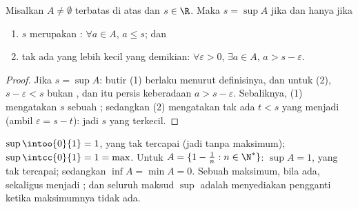 \begin{proposition}\label{prop:b1:reals:epsilon}
Misalkan $A \neq \emptyset$ terbatas di atas dan $s \in \R$. Maka $s =
\sup A$ jika dan hanya jika
\begin{enumerate}
  \item $s$ merupakan : $\forall a \in A$, $a \leq s$; dan
  \item tak ada yang lebih kecil yang demikian: $\forall \varepsilon > 0$, $\exists a \in
        A$, $a > s - \varepsilon$.
\end{enumerate}
\end{proposition}

\begin{proof}
Jika $s = \sup A$: butir (1) berlaku menurut definisinya, dan untuk (2), $s -
\varepsilon < s$ bukan , dan itu persis
keberadaan $a > s - \varepsilon$. Sebaliknya, (1) mengatakan $s$ sebuah
; sedangkan (2) mengatakan tak ada $t < s$ yang menjadi  (ambil $\varepsilon
= s - t$): jadi $s$ yang terkecil.
\end{proof}

\begin{example}\label{ex:b1:reals:supexamples}
$\sup \intoo{0}{1} = 1$, yang tak tercapai (jadi tanpa maksimum);
$\sup \intcc{0}{1} = 1 = \max$. Untuk $A = \{1 - \frac 1n : n \in
\N^*\}$: $\sup A = 1$, yang tak tercapai; sedangkan $\inf A = \min A = 0$. Sebuah maksimum,
bila ada, sekaligus menjadi ; dan seluruh maksud $\sup$ adalah menyediakan
pengganti ketika maksimumnya tidak ada.
\end{example}

